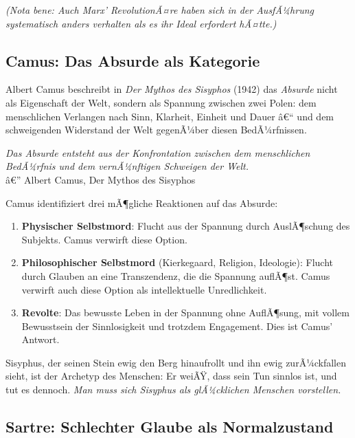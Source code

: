 ﻿\documentclass[12pt, a4paper]{article}
\begin{document}
\textit{(Nota bene: Auch Marx' RevolutionÃ¤re haben sich in der AusfÃ¼hrung\\
\hspace{0.5cm}systematisch anders verhalten als es ihr Ideal erfordert hÃ¤tte.)}

\subsection{Camus: Das Absurde als Kategorie}

Albert Camus beschreibt in \textit{Der Mythos des Sisyphos} (1942) das
\emph{Absurde} nicht als Eigenschaft der Welt, sondern als Spannung zwischen
zwei Polen: dem menschlichen Verlangen nach Sinn, Klarheit, Einheit und Dauer â€“
und dem schweigenden Widerstand der Welt gegenÃ¼ber diesen BedÃ¼rfnissen.

\begin{displayquote}
  \textit{Das Absurde entsteht aus der Konfrontation zwischen dem menschlichen
  BedÃ¼rfnis und dem vernÃ¼nftigen Schweigen der Welt.}\\
  \hfill â€” Albert Camus, Der Mythos des Sisyphos
\end{displayquote}

Camus identifiziert drei mÃ¶gliche Reaktionen auf das Absurde:
\begin{enumerate}
  \item \textbf{Physischer Selbstmord}: Flucht aus der Spannung durch AuslÃ¶schung
    des Subjekts. Camus verwirft diese Option.
  \item \textbf{Philosophischer Selbstmord} (Kierkegaard, Religion, Ideologie):
    Flucht durch Glauben an eine Transzendenz, die die Spannung auflÃ¶st.
    Camus verwirft auch diese Option als intellektuelle Unredlichkeit.
  \item \textbf{Revolte}: Das bewusste Leben in der Spannung ohne AuflÃ¶sung,
    mit vollem Bewusstsein der Sinnlosigkeit und trotzdem Engagement. Dies
    ist Camus' Antwort.
\end{enumerate}

Sisyphus, der seinen Stein ewig den Berg hinaufrollt und ihn ewig zurÃ¼ckfallen
sieht, ist der Archetyp des Menschen: Er weiÃŸ, dass sein Tun sinnlos ist, und tut
es dennoch. \textit{Man muss sich Sisyphus als glÃ¼cklichen Menschen vorstellen.}

\subsection{Sartre: Schlechter Glaube als Normalzustand}
\end{document}
